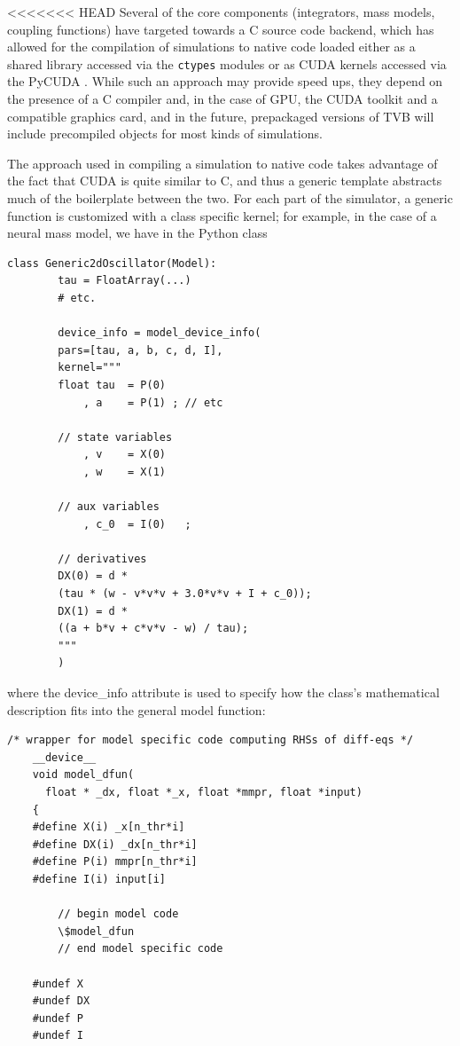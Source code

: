 <<<<<<< HEAD
	Several of the core components (integrators, mass models, coupling
	functions) have targeted towards a C source code backend, which has
	allowed for the compilation of simulations to native code loaded 
	either as a shared library accessed via the \texttt{ctypes} modules
	or as CUDA kernels accessed via the PyCUDA \cite{PyCUDA}. 
	While such an approach may provide speed ups, they depend on the
	presence of a C compiler and, in the case of GPU, the CUDA toolkit and
	a compatible graphics card, and in the future, prepackaged versions of TVB
	will include precompiled objects for most kinds of simulations. 

	The approach used in compiling a simulation to native code takes advantage
	of the fact that CUDA is quite similar to C, and thus a generic template
	abstracts much of the boilerplate between the two. For each part of the 
	simulator, a generic function is customized with a class specific kernel;
	for example, in the case of a neural mass model, we have in the Python class

    \begin{lstlisting}[caption={The Generic2dOscillator listing},
                       label={lst:g2dOscil}]
	class Generic2dOscillator(Model):
	    tau = FloatArray(...)
	    # etc.

	    device_info = model_device_info(
		pars=[tau, a, b, c, d, I],
		kernel="""
		float tau  = P(0)
		    , a    = P(1) ; // etc

		// state variables
		    , v    = X(0)
		    , w    = X(1)

		// aux variables
		    , c_0  = I(0)   ;

		// derivatives
		DX(0) = d * 
		(tau * (w - v*v*v + 3.0*v*v + I + c_0));
		DX(1) = d * 
		((a + b*v + c*v*v - w) / tau);
		"""
	    )
	\end{lstlisting}

	\noindent where the device\_info attribute is used to specify how the
	class's mathematical description fits into the general model function:

    \begin{lstlisting}[caption={The Listing},label={lst:wrapper}]
	/* wrapper for model specific code computing RHSs of diff-eqs */
	__device__
	void model_dfun(
	  float * _dx, float *_x, float *mmpr, float *input)
	{
	#define X(i) _x[n_thr*i]
	#define DX(i) _dx[n_thr*i]
	#define P(i) mmpr[n_thr*i]
	#define I(i) input[i]

	    // begin model code
	    \$model_dfun
	    // end model specific code

	#undef X
	#undef DX
	#undef P
	#undef I
	\end{lstlisting}

